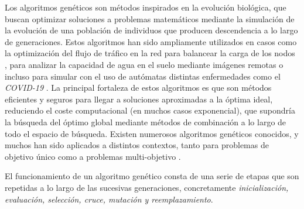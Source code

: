 \documentclass{uathesis-es}
\begin{document}
	Los algoritmos genéticos son métodos inspirados en la evolución biológica, que buscan optimizar soluciones a problemas matemáticos mediante la simulación de la evolución de una población de individuos que producen descendencia a lo largo de generaciones. Estos algoritmos han sido ampliamente utilizados en casos como la optimización del flujo de tráfico en la red para balancear la carga de los nodos \cite{5483775}, para analizar la capacidad de agua en el suelo mediante imágenes remotas \cite{PACHEPSKY1998213} o incluso para simular con el uso de autómatas distintas enfermedades como el \textit{COVID-19} \cite{GHOSH2020106692}. La principal fortaleza de estos algoritmos es que son métodos eficientes y seguros para llegar a soluciones aproximadas a la óptima ideal, reduciendo el coste computacional (en muchos casos exponencial), que supondría la búsqueda del óptimo global mediante métodos de combinación a lo largo de todo el espacio de búsqueda. Existen numerosos algoritmos genéticos conocidos, y muchos han sido aplicados a distintos contextos, tanto para problemas de objetivo único como a problemas multi-objetivo \cite{wang2020comparative}.
	
	El funcionamiento de un algoritmo genético consta de una serie de etapas que son repetidas a lo largo de las sucesivas generaciones, concretamente \textit{inicialización, evaluación, selección, cruce, mutación y reemplazamiento}.
	
\end{document}
